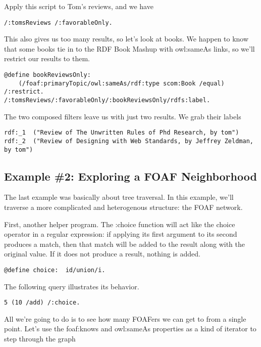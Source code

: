 \documentclass[runningheads]{llncs}
\begin{document}
Apply this script to Tom's reviews, and we have

\begin{verbatim}
/:tomsReviews /:favorableOnly.
\end{verbatim}

This also gives us too many results, so let's look at books.  We happen to know that some books tie in to the RDF Book Mashup with owl:sameAs links, so we'll restrict our results to them.

\begin{verbatim}
@define bookReviewsOnly:
    (/foaf:primaryTopic/owl:sameAs/rdf:type scom:Book /equal) /:restrict.
/:tomsReviews/:favorableOnly/:bookReviewsOnly/rdfs:label.
\end{verbatim}

The two composed filters leave us with just two results.  We grab their labels

\begin{verbatim}
rdf:_1  ("Review of The Unwritten Rules of Phd Research, by tom")
rdf:_2  ("Review of Designing with Web Standards, by Jeffrey Zeldman, by tom")
\end{verbatim}


\subsection{Example \#2: Exploring a FOAF Neighborhood}

The last example was basically about tree traversal.  In this example, we'll traverse a more complicated and heterogenous structure: the FOAF network.

First, another helper program.  The :choice function will act like the choice operator in a regular expression: if applying its first argument to its second produces a match, then that match will be added to the result along with the original value.  If it does not produce a result, nothing is added.

\begin{verbatim}
@define choice:  id/union/i.
\end{verbatim}

The following query illustrates its behavior.

\begin{verbatim}
5 (10 /add) /:choice.
\end{verbatim}

All we're going to do is to see how many FOAFers we can get to from a single point.  Let's use the foaf:knows and owl:sameAs properties as a kind of iterator to step through the graph
\end{document}
